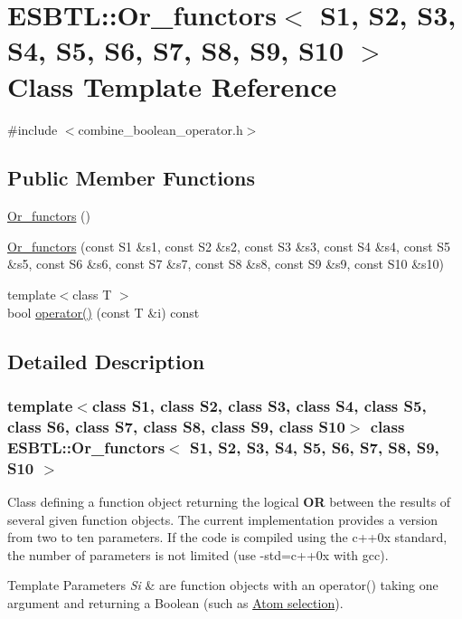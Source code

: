 \hypertarget{classESBTL_1_1Or__functors}{}\section{E\+S\+B\+TL\+:\+:Or\+\_\+functors$<$ S1, S2, S3, S4, S5, S6, S7, S8, S9, S10 $>$ Class Template Reference}
\label{classESBTL_1_1Or__functors}


{\ttfamily \#include $<$combine\+\_\+boolean\+\_\+operator.\+h$>$}

\subsection*{Public Member Functions}
\begin{DoxyCompactItemize}
\item 
\hyperlink{classESBTL_1_1Or__functors_a58e128dbb44010f461a015f3bb821154}{Or\+\_\+functors} ()
\item 
\hyperlink{classESBTL_1_1Or__functors_af10fb3e218100683e0d5a833500c1574}{Or\+\_\+functors} (const S1 \&s1, const S2 \&s2, const S3 \&s3, const S4 \&s4, const S5 \&s5, const S6 \&s6, const S7 \&s7, const S8 \&s8, const S9 \&s9, const S10 \&s10)
\item 
{\footnotesize template$<$class T $>$ }\\bool \hyperlink{classESBTL_1_1Or__functors_a58797de9973d21d0cb431bbe2d98ec7a}{operator()} (const T \&i) const
\end{DoxyCompactItemize}


\subsection{Detailed Description}
\subsubsection*{template$<$class S1, class S2, class S3, class S4, class S5, class S6, class S7, class S8, class S9, class S10$>$\newline
class E\+S\+B\+T\+L\+::\+Or\+\_\+functors$<$ S1, S2, S3, S4, S5, S6, S7, S8, S9, S10 $>$}

Class defining a function object returning the logical {\bfseries OR} between the results of several given function objects. The current implementation provides a version from two to ten parameters. If the code is compiled using the c++0x standard, the number of parameters is not limited (use {\ttfamily -\/std=c++0x} with {\ttfamily gcc}). 
\begin{DoxyTemplParams}{Template Parameters}
{\em Si} & are function objects with an operator() taking one argument and returning a Boolean (such as \hyperlink{group__atomsel}{Atom selection}). \\
\hline
\end{DoxyTemplParams}


